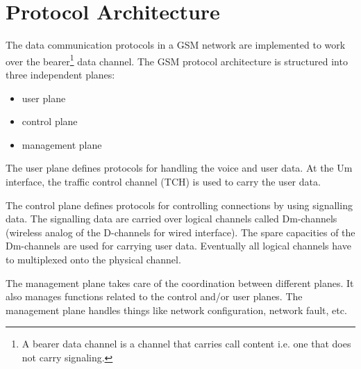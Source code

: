 \section{Protocol Architecture}
The data communication protocols in a GSM network are implemented to work over the bearer\footnote{A bearer data channel is a channel that carries call content i.e.
one that does not carry signaling.} data channel. 
The GSM protocol architecture is structured into three independent planes:
\begin{itemize}[noitemsep,topsep=0pt,parsep=0pt,partopsep=0pt]
 \item user plane
 \item control plane
 \item management plane
\end{itemize}

The user plane defines protocols for handling the voice and user data. 
At the Um interface, the traffic control channel (TCH) is used to carry the user data.


The control plane defines protocols for controlling connections by using signalling data.
The signalling data are carried over logical channels called Dm-channels (wireless analog of the D-channels for wired interface).
The spare capacities of the Dm-channels are used for carrying user data.
Eventually all logical channels have to multiplexed onto the physical channel.


The management plane takes care of the coordination between different planes.
It also manages functions related to the control and/or user planes.
The management plane handles things like network configuration, network fault, etc.



